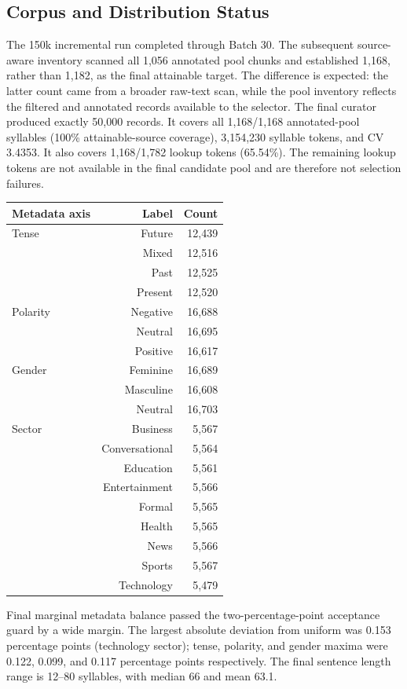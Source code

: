 \documentclass[11pt,a4paper]{article}
\begin{document}
\subsection{Corpus and Distribution Status}
The 150k incremental run completed through Batch 30. The subsequent source-aware inventory scanned all 1,056 annotated pool chunks and established 1,168, rather than 1,182, as the final attainable target. The difference is expected: the latter count came from a broader raw-text scan, while the pool inventory reflects the filtered and annotated records available to the selector.
The final curator produced exactly 50,000 records. It covers all 1,168/1,168 annotated-pool syllables (100\% attainable-source coverage), 3,154,230 syllable tokens, and CV 3.4353. It also covers 1,168/1,782 lookup tokens (65.54\%). The remaining lookup tokens are not available in the final candidate pool and are therefore not selection failures.
\begin{longtable}{lrr}
\toprule
\textbf{Metadata axis} & \textbf{Label} & \textbf{Count} \\
\midrule
\endhead
Tense & Future & 12,439 \\
& Mixed & 12,516 \\
& Past & 12,525 \\
& Present & 12,520 \\
\addlinespace
Polarity & Negative & 16,688 \\
& Neutral & 16,695 \\
& Positive & 16,617 \\
\addlinespace
Gender & Feminine & 16,689 \\
& Masculine & 16,608 \\
& Neutral & 16,703 \\
\addlinespace
Sector & Business & 5,567 \\
& Conversational & 5,564 \\
& Education & 5,561 \\
& Entertainment & 5,566 \\
& Formal & 5,565 \\
& Health & 5,565 \\
& News & 5,566 \\
& Sports & 5,567 \\
& Technology & 5,479 \\
\bottomrule
\end{longtable}
Final marginal metadata balance passed the two-percentage-point acceptance guard by a wide margin. The largest absolute deviation from uniform was 0.153 percentage points (technology sector); tense, polarity, and gender maxima were 0.122, 0.099, and 0.117 percentage points respectively. The final sentence length range is 12--80 syllables, with median 66 and mean 63.1.
\end{document}
